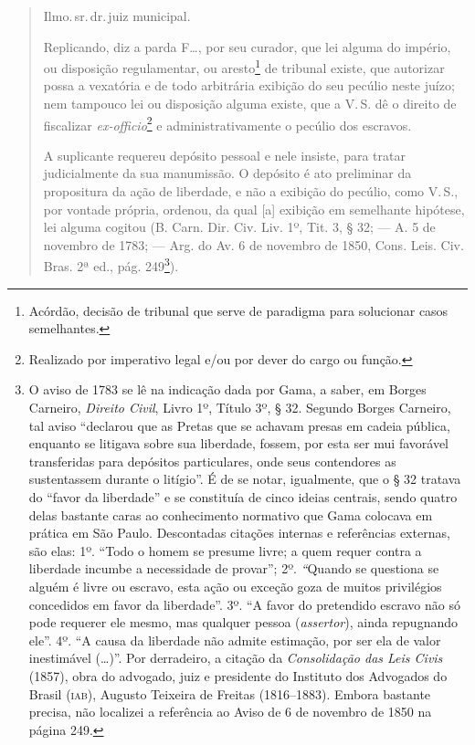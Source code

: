 \begin{quote}
Ilmo.\,sr.\,dr.\,juiz municipal.

Replicando, diz a parda F\ldots{}, por seu curador, que lei alguma do
império, ou disposição regulamentar, ou aresto\footnote{ Acórdão,
  decisão de tribunal que serve de paradigma para solucionar casos
  semelhantes.} de tribunal existe, que autorizar possa a vexatória e de
todo arbitrária exibição do seu pecúlio neste juízo; nem tampouco lei ou
disposição alguma existe, que a V.\,S. dê o direito de fiscalizar
\emph{ex-officio}\footnote{ Realizado por imperativo legal e/ou por
  dever do cargo ou função.} e administrativamente o pecúlio dos
escravos.

A suplicante requereu depósito pessoal e nele insiste, para tratar
judicialmente da sua manumissão. O depósito é ato preliminar da
propositura da ação de liberdade, e não a exibição do pecúlio, como V.\,S., por vontade própria, ordenou, da qual {[}a{]} exibição em semelhante
hipótese, lei alguma cogitou (B. Carn. Dir. Civ. Liv. 1º, Tit. 3, § 32;
--- A. 5 de novembro de 1783; --- Arg. do Av. 6 de novembro de 1850, Cons.
Leis. Civ. Bras. 2ª ed., pág. 249\footnote{ O aviso de 1783 se lê na
  indicação dada por Gama, a saber, em Borges Carneiro, \emph{Direito
  Civil}, Livro 1º, Título 3º, § 32. Segundo Borges Carneiro, tal aviso
  ``declarou que as Pretas que se achavam presas em cadeia pública,
  enquanto se litigava sobre sua liberdade, fossem, por esta ser mui
  favorável transferidas para depósitos particulares, onde seus
  contendores as sustentassem durante o litígio''. É de se notar,
  igualmente, que o § 32 tratava do ``favor da liberdade'' e se constituía
  de cinco ideias centrais, sendo quatro delas bastante caras ao
  conhecimento normativo que Gama colocava em prática em São Paulo.
  Descontadas citações internas e referências externas, são elas: 1º.
  ``Todo o homem se presume livre; a quem requer contra a liberdade
  incumbe a necessidade de provar''; 2º. \emph{``}Quando se questiona se
  alguém é livre ou escravo, esta ação ou exceção goza de muitos
  privilégios concedidos em favor da liberdade''. 3º. ``A favor do
  pretendido escravo não só pode requerer ele mesmo, mas qualquer pessoa
  (\emph{assertor}), ainda repugnando ele''. 4º. ``A causa da liberdade
  não admite estimação, por ser ela de valor inestimável (\ldots{})''. Por
  derradeiro, a citação da \emph{Consolidação das Leis Civis} (1857),
  obra do advogado, juiz e presidente do Instituto dos Advogados do
  Brasil (\textsc{iab}), Augusto Teixeira de Freitas (1816--1883). Embora bastante
  precisa, não localizei a referência ao Aviso de 6 de novembro de 1850
  na página 249.}).


\end{quote}
